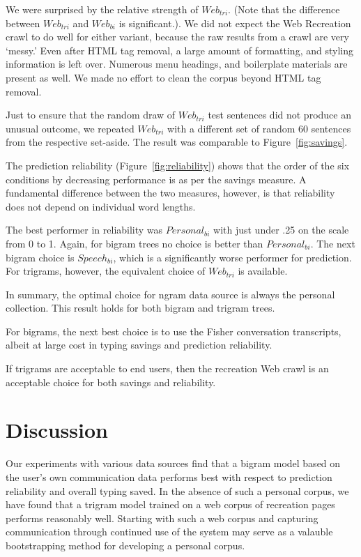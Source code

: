 \documentclass{sigchi}
\begin{document}
We were surprised by the relative strength of $Web_{tri}$. (Note that
the difference between $Web_{tri}$ and $Web_{bi}$ is significant.). We
did not expect the Web Recreation crawl to do well for either variant,
because the raw results from a crawl are very `messy.' Even after HTML
tag removal, a large amount of formatting, and styling information is
left over. Numerous menu headings, and boilerplate materials are
present as well. We made no effort to clean the corpus beyond HTML tag
removal.

Just to ensure that the random draw of $Web_{tri}$ test sentences did
not produce an unusual outcome, we repeated $Web_{tri}$ with a
different set of random 60 sentences from the respective
set-aside. The result was comparable to Figure~\ref{fig:savings}.

The prediction reliability (Figure~\ref{fig:reliability}) shows that
the order of the six conditions by decreasing performance is as per the
savings measure. A fundamental difference between the two measures,
however, is that reliability does not depend on individual word
lengths. 

The best performer in reliability was $Personal_{bi}$ with just under
.25 on the scale from 0 to 1. Again, for bigram trees no choice is
better than $Personal_{bi}$. The next bigram choice is $Speech_{bi}$,
which is a significantly worse performer for prediction. For trigrams,
however, the equivalent choice of $Web_{tri}$ is available.

In summary, the optimal choice for ngram data source is always the
personal collection. This result holds for both bigram and trigram
trees. 

For bigrams, the next best choice is to use the Fisher
conversation transcripts, albeit at large cost in typing savings and
prediction reliability.

If trigrams are acceptable to end users, then the recreation Web crawl
is an acceptable choice for both savings and reliability.

\section{Discussion}

Our experiments with various data sources find that a bigram model based on the user's own communication data performs best with respect to prediction reliability and overall typing saved. In the absence of such a personal corpus, we have found that a trigram model trained on a web corpus of recreation pages performs reasonably well. Starting with such a web corpus and capturing communication through continued use of the system may serve as a valauble bootstrapping method for developing a personal corpus.
\end{document}
